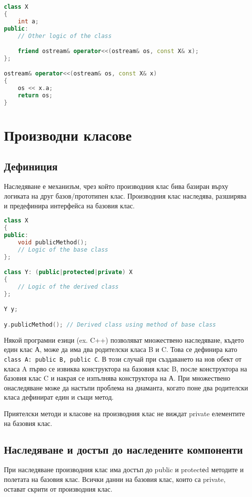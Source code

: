 \documentclass[fleqn,12pt]{article}
\begin{document}
\begin{lstlisting}[language=C++, caption=Example overriding of an operator]
class X
{
    int a;
public:
    // Other logic of the class

    friend ostream& operator<<(ostream& os, const X& x);
};

ostream& operator<<(ostream& os, const X& x)
{
    os << x.a;
    return os;
}
\end{lstlisting}


\section{Производни класове}
\subsection{Дефиниция}
Наследяване е механизъм, чрез който производния клас бива базиран върху логиката на друг базов/прототипен клас. Производния клас наследява, разширява и предефинира интерфейса на базовия клас. 

\begin{lstlisting}[language=C++, caption=Example inheritence]
class X
{
public:
    void publicMethod();
    // Logic of the base class
};

class Y: (public|protected|private) X
{
    // Logic of the derived class
};

Y y;

y.publicMethod(); // Derived class using method of base class

\end{lstlisting}

Някой програмни езици (ex. C++) позволяват множествено наследяване, където един клас А, може да има два родителски класа B и C. Това се дефинира като \texttt{ class A: public B, public C}. В този случай при създаването на нов обект от класа A първо се извиква конструктора на базовия клас B, после конструктора на базовия клас C и накрая се изпълнява конструктора на А.
При множествено онаследяване може да настъпи проблема на диаманта, когато поне два родителски класа дефинират един и същи метод.

Приятелски методи и класове на производния клас не виждат private елементите на базовия клас.

\subsection{Наследяване и достъп до наследените компоненти}
При наследяване производния клас има достъп до public и protectеd методите и полетата на базовия клас. Всички данни на базовия клас, които са private, остават скрити от производния клас. 
\end{document}
